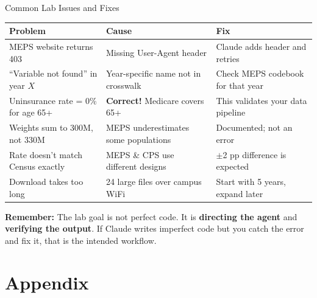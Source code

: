 \documentclass[10pt,english,aspectratio=169]{beamer}
\begin{document}
\begin{frame}{Common Lab Issues and Fixes}

\begin{small}
\begin{tabular}{p{4cm}p{4cm}p{4cm}}
\toprule
\textbf{Problem} & \textbf{Cause} & \textbf{Fix} \\
\midrule
MEPS website returns 403 & Missing User-Agent header & Claude adds header and retries \\
``Variable not found'' in year $X$ & Year-specific name not in crosswalk & Check MEPS codebook for that year \\
Uninsurance rate = 0\% for age 65+ & \textbf{Correct!} Medicare covers 65+ & This validates your data pipeline \\
Weights sum to 300M, not 330M & MEPS underestimates some populations & Documented; not an error \\
Rate doesn't match Census exactly & MEPS \& CPS use different designs & $\pm$2 pp difference is expected \\
Download takes too long & 24 large files over campus WiFi & Start with 5 years, expand later \\
\bottomrule
\end{tabular}
\end{small}

\vspace{0.3cm}
\textbf{Remember:} The lab goal is not perfect code. It is \textbf{directing the agent} and \textbf{verifying the output}. If Claude writes imperfect code but you catch the error and fix it, that is the intended workflow.

\end{frame}


\appendix
\section{Appendix}
\end{document}
